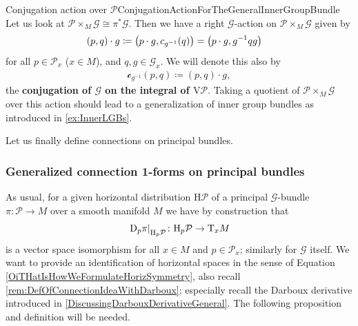 \documentclass[reqno,a4paper,oneside]{amsart}
\theoremstyle{plain}
\theoremstyle{remark}
\theoremstyle{definition}
\begin{document}
\begin{examples}{Conjugation action over $\mathcal{P}$}{ConjugationActionForTheGeneralInnerGroupBundle}
Let us look at $\mathcal{P} \times_M \mathcal{G} \cong \pi^*\mathcal{G}$. Then we have a right $\mathcal{G}$-action on $\mathcal{P} \times_M \mathcal{G}$ given by
\begin{align*}
(p, q) \cdot g
&\coloneqq
\mleft( p \cdot g, c_{g^{-1}}(q) \mright)
=
\mleft( p \cdot g, g^{-1} q g \mright)
\end{align*}
for all $p \in \mathcal{P}_x$ ($x \in M$), and $q,g \in \mathcal{G}_x$.
We will denote this also by
\begin{align*}
\mathcal{c}_{g^{-1}}(p, q)
\coloneqq
(p, q) \cdot g,
\end{align*}
the \textbf{conjugation of $\mathcal{G}$ on the integral of $\mathrm{V}\mathcal{P}$}. Taking a quotient of $\mathcal{P} \times_M \mathcal{G}$ over this action should lead to a generalization of inner group bundles as introduced in \ref{ex:InnerLGBs}.
\end{examples}

Let us finally define connections on principal bundles.

\subsubsection{Generalized connection 1-forms on principal bundles}

As usual, for a given horizontal distribution $\mathrm{H}\mathcal{P}$ of a principal $\mathcal{G}$-bundle $\pi\colon\mathcal{P} \to M$ over a smooth manifold $M$ we have by construction that
\begin{align*}
\mleft.\mathrm{D}_p \pi\mright|_{\mathrm{H}_p\mathcal{P}}\colon \mathrm{H}_p\mathcal{P} \to \mathrm{T}_xM
\end{align*}
is a vector space isomorphism for all $x \in M$ and $p \in \mathcal{P}_x$; similarly for $\mathcal{G}$ itself. We want to provide an identification of horizontal spaces in the sense of Equation \eqref{OiTHatIsHowWeFormulateHorizSymmetry}, also recall \ref{rem:DefOfConnectionIdeaWithDarboux}; especially recall the Darboux derivative introduced in \ref{DiscussingDarbouxDerivativeGeneral}. The following proposition and definition will be needed.
\end{document}
